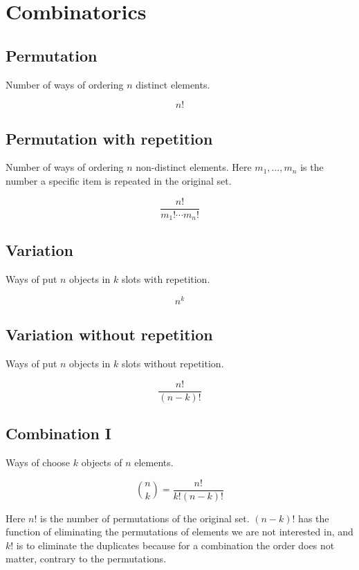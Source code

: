 \newpage
\section{Combinatorics}

\subsection{Permutation}

Number of ways of ordering \(n\) distinct elements.

\[n!\]

\subsection{Permutation with repetition}

Number of ways of ordering \(n\) non-distinct elements. Here \(m_1, \dots, m_n\)
is the number a specific item is repeated in the original set.

\[\frac{n!}{m_1! \cdots m_n!}\]

\subsection{Variation}

Ways of put \(n\) objects in \(k\) slots with repetition.

\[n^k\]

\subsection{Variation without repetition}

Ways of put \(n\) objects in \(k\) slots without repetition.

\[\frac{n!}{(n -k)!}\]

\subsection{Combination I}

Ways of choose \(k\) objects of \(n\) elements.

\[\binom{n}{k} = \frac{n!}{k!(n-k)!}\]

Here \(n\)! is the number of permutations of the original set.
\((n-k)\)! has the function of eliminating the permutations of elements we are not interested in, and
\(k\)! is to eliminate the duplicates because for a combination the order does not matter, contrary to
the permutations.

